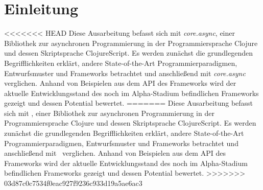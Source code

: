 \chapter{Einleitung}
<<<<<<< HEAD
Diese Ausarbeitung befasst sich mit \textit{core.async}, einer Bibliothek zur asynchronen Programmierung in der Programmiersprache Clojure und dessen Skriptsprache ClojureScript. Es werden zunächst die grundlegenden Begrifflichkeiten erklärt, andere State-of-the-Art Programmierparadigmen, Entwurfsmuster und Frameworks betrachtet und anschließend mit \textit{core.async} verglichen. Anhand von Beispielen aus dem \acf{API} des Frameworks wird der aktuelle Entwicklungsstand des noch im Alpha-Stadium befindlichen Frameworks gezeigt und dessen Potential bewertet.
=======
Diese Ausarbeitung befasst sich mit \CA , einer Bibliothek zur asynchronen Programmierung in der Programmiersprache Clojure und dessen Skriptsprache ClojureScript. Es werden zunächst die grundlegenden Begrifflichkeiten erklärt, andere State-of-the-Art Programmierparadigmen, Entwurfsmuster und Frameworks betrachtet und anschließend mit \CA\  verglichen. Anhand von Beispielen aus dem \acf{API} des Frameworks wird der aktuelle Entwicklungsstand des noch im Alpha-Stadium befindlichen Frameworks gezeigt und dessen Potential bewertet.
>>>>>>> 03d87c0c7534f0eac927f9236c933d19a5ae6ac3

\acresetall